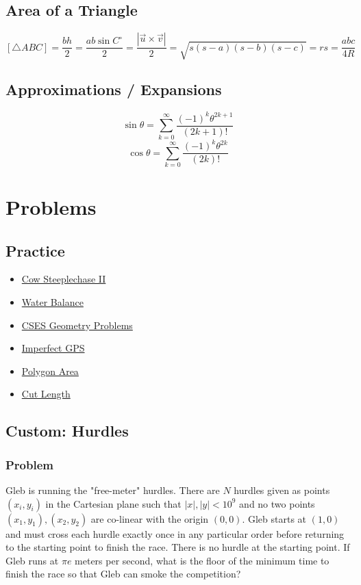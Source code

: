 \documentclass{article}
\begin{document}
\subsection{Area of a Triangle}
$$
[\triangle ABC]=\frac{bh}{2}=\frac{ab\sin C^{\circ}}{2}=\frac{|\vec{u}\times\vec{v}|}{2}
=\sqrt{s(s-a)(s-b)(s-c)}=rs=\frac{abc}{4R}
$$
\subsection{Approximations / Expansions}
$$\sin\theta=\sum_{k=0}^{\infty}\frac{(-1)^{k}\theta^{2k+1}}{(2k+1)!}$$
$$\cos\theta=\sum_{k=0}^{\infty}\frac{(-1)^{k}\theta^{2k}}{(2k)!}$$

\section{Problems}
\subsection{Practice}
\begin{itemize}
    \item \href{http://usaco.org/index.php?page=viewproblem2&cpid=943}{Cow Steeplechase II}
    \item \href{https://codeforces.com/problemset/problem/1299/C}{Water Balance}
    \item \href{https://cses.fi/problemset/}{CSES Geometry Problems}
    \item \href{https://open.kattis.com/problems/imperfectgps}{Imperfect GPS}
    \item \href{https://open.kattis.com/problems/polygonarea}{Polygon Area}
    \item \href{https://codeforces.com/contest/598/problem/F}{Cut Length}
\end{itemize}
\subsection{Custom: Hurdles}
\subsubsection{Problem}
Gleb is running the "free-meter" hurdles. There are $N$ hurdles given as points $(x_{i},y_{i})$ in the Cartesian plane such that $|x|,|y|<10^{9}$ and no two points $(x_{1},y_{1}),(x_{2},y_{2})$ are co-linear with the origin $(0,0)$. Gleb starts at $(1,0)$ and must cross each hurdle exactly once in any particular order before returning to the starting point to finish the race. There is no hurdle at the starting point. If Gleb runs at $\pi e$ meters per second, what is the floor of the minimum time to finish the race so that Gleb can smoke the competition? 
\end{document}
